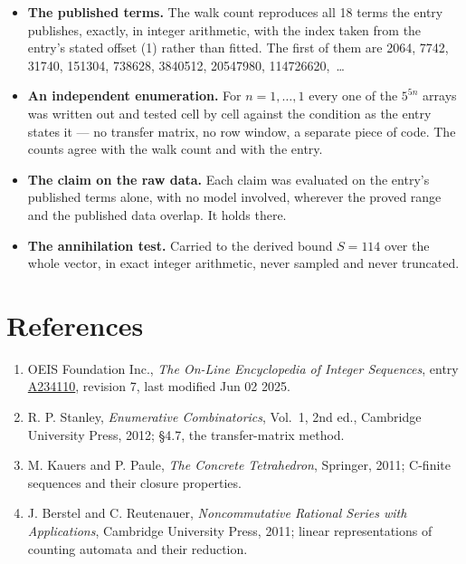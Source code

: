 \documentclass[11pt]{article}
\theoremstyle{definition}
\begin{document}
\begin{itemize}

\item {\bfseries The published terms.} The walk count reproduces all 18 terms the entry publishes, exactly, in integer arithmetic, with the index taken from the entry's stated offset (1) rather than fitted. The first of them are 2064, 7742, 31740, 151304, 738628, 3840512, 20547980, 114726620,~\dots

\item {\bfseries An independent enumeration.} For $n = 1,\dots,1$ every one of the $5^{5n}$ arrays was written out and tested cell by cell against the condition as the entry states it --- no transfer matrix, no row window, a separate piece of code. The counts agree with the walk count and with the entry.

\item {\bfseries The claim on the raw data.} Each claim was evaluated on the entry's published terms alone, with no model involved, wherever the proved range and the published data overlap. It holds there.

\item {\bfseries The annihilation test.} Carried to the derived bound $S = 114$ over the whole vector, in exact integer arithmetic, never sampled and never truncated.

\end{itemize}

\section{References}

\begin{enumerate}

\item OEIS Foundation Inc., \emph{The On-Line Encyclopedia of Integer Sequences}, entry \href{https://oeis.org/A234110}{A234110}, revision 7, last modified Jun 02 2025.

\item R. P. Stanley, \emph{Enumerative Combinatorics}, Vol.~1, 2nd ed., Cambridge University Press, 2012; \S4.7, the transfer-matrix method.

\item M. Kauers and P. Paule, \emph{The Concrete Tetrahedron}, Springer, 2011; C-finite sequences and their closure properties.

\item J. Berstel and C. Reutenauer, \emph{Noncommutative Rational Series with Applications}, Cambridge University Press, 2011; linear representations of counting automata and their reduction.

\end{enumerate}
\end{document}
